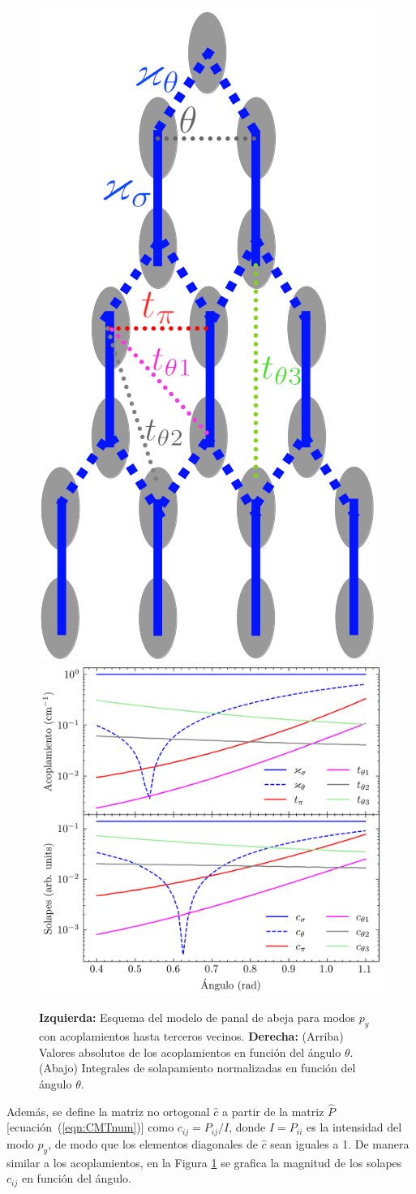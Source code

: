 \begin{figure}[H]
	\centering
	\includegraphics[width=0.25\linewidth]{media/honeycomb-lattice.png}
	\includegraphics[width=0.55\linewidth]{codigo/NNNN_overlap_vs_angle.png}
	\caption[Modelo de panal de abeja para modos $p_y$ con acoplamientos hasta terceros vecinos]{\textbf{Izquierda:} Esquema del modelo de panal de abeja para modos $p_y$ con acoplamientos hasta terceros vecinos. \textbf{Derecha:} (Arriba) Valores absolutos de los acoplamientos en función del ángulo $\theta$. (Abajo) Integrales de solapamiento normalizadas en función del ángulo $\theta$.\label{fig:honeycombmodel}}
\end{figure} \vspace{-3ex} Además, se define la matriz no ortogonal $\hat{c}$ a partir de la matriz $\hat{P}$ [ecuación~(\ref{eqn:CMTnum})] como $c_{ij} = P_{ij}/I$, donde $I = P_{ii}$ es la intensidad del modo $p_y$, de modo que los elementos diagonales de $\hat{c}$ sean iguales a 1. De manera similar a los acoplamientos, en la Figura \ref{fig:honeycombmodel} se grafica la magnitud de los solapes $c_{ij}$ en función del ángulo.

